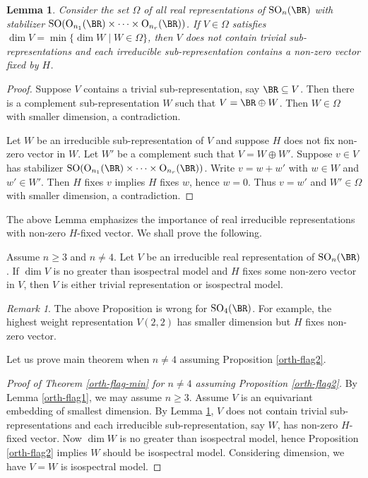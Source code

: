 \documentclass[a4paper]{amsart}
\newcommand{\RO}{{\mathrm {O}}} \newcommand{\RP}{{\mathrm {P}}}
\newcommand{\SO}{{\mathrm{SO}}}\newcommand{\so}{\mathfrak{so}}
\theoremstyle{plain}
\newtheorem{lem}[thm]{Lemma}
\theoremstyle{remark} \newtheorem{remark}[thm]{Remark}
\theoremstyle{remark} \newtheorem{exercise}{Exercise}
\theoremstyle{remark} \newtheorem{example}{Example}
\numberwithin{equation}{section}
\begin{document}
\begin{lem}\label{min-dim-fix}
    Consider the set $\Omega$ of all real representations of $\SO_n(\BR)$ with stabilizer $\SO(\RO_{n_1}(\BR)\times\cdots\times\RO_{n_r}(\BR))$. If $V\in\Omega$ satisfies $\dim V=\min\{\dim W\mid W\in\Omega\}$, then $V$ does not contain trivial sub-representations and each irreducible sub-representation contains a non-zero vector fixed by $H$.
\end{lem}
\begin{proof}
    Suppose $V$ contains a trivial sub-representation, say $\BR\subseteq V$. Then there is a complement sub-representation $W$ such that $V=\BR\oplus W$. Then $W\in\Omega$ with smaller dimension, a contradiction.
    
    Let $W$ be an irreducible sub-representation of $V$ and suppose $H$ does not fix non-zero vector in $W$. Let $W'$ be a complement such that $V=W\oplus W'$. Suppose $v\in V$ has stabilizer $\SO(\RO_{n_1}(\BR)\times\cdots\times\RO_{n_r}(\BR))$. Write $v=w+w'$ with $w\in W$ and $w'\in W'$. Then $H$ fixes $v$ implies $H$ fixes $w$, hence $w=0$. Thus $v=w'$ and $W'\in\Omega$ with smaller dimension, a contradiction.
\end{proof}

The above Lemma emphasizes the importance of real irreducible representations with non-zero $H$-fixed vector. We shall prove the following.

\begin{prop}\label{orth-flag2}
    Assume $n\geqslant 3$ and $n\neq 4$. Let $V$ be an irreducible real representation of $\SO_n(\BR)$. If $\dim V$ is no greater than isospectral model and $H$ fixes some non-zero vector in $V$, then $V$ is either trivial representation or isospectral model.
\end{prop}

\begin{remark}
    The above Proposition is wrong for $\SO_4(\BR)$. For example, the highest weight representation $V(2,2)$ has smaller dimension but $H$ fixes non-zero vector.
\end{remark}

Let us prove main theorem when $n\neq 4$ assuming Proposition \ref{orth-flag2}.

\begin{proof}[Proof of Theorem \ref{orth-flag-min} for $n\neq 4$ assuming Proposition \ref{orth-flag2}]
    By Lemma \ref{orth-flag1}, we may assume $n\geqslant 3$. Assume $V$ is an equivariant embedding of smallest dimension. By Lemma \ref{min-dim-fix}, $V$ does not contain trivial sub-representations and each irreducible sub-representation, say $W$, has non-zero $H$-fixed vector. Now $\dim W$ is no greater than isospectral model, hence Proposition \ref{orth-flag2} implies $W$ should be isospectral model. Considering dimension, we have $V=W$ is isospectral model.
\end{proof}
\end{document}
